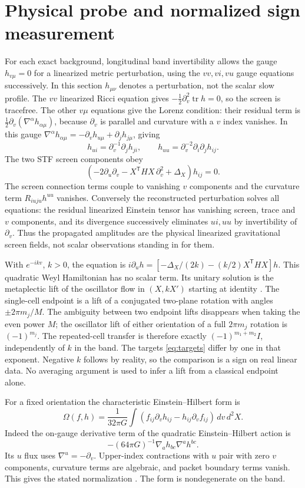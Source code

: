 \documentclass[11pt]{article}
\newcommand{\tr}{\operatorname{tr}}
\begin{document}
\section{Physical probe and normalized sign measurement}
For each exact background, longitudinal band invertibility allows the gauge \(h_{v\mu}=0\) for a linearized metric perturbation, using the \(vv,vi,vu\) gauge equations successively. In this section \(h_{\mu\nu}\) denotes a perturbation, not the scalar slow profile. The \(vv\) linearized Ricci equation gives \(-\tfrac12\partial_v^2\tr h=0\), so the screen is tracefree. The other \(v\mu\) equations give the Lorenz condition: their residual term is \(\tfrac12\partial_v(\nabla^\alpha h_{\alpha\mu})\), because \(\partial_v\) is parallel and curvature with a \(v\) index vanishes. In this gauge \(\nabla^\alpha h_{\alpha\mu}=-\partial_v h_{u\mu}+\partial_jh_{j\mu}\), giving
\[
 h_{ui}=\partial_v^{-1}\partial_jh_{ji},\qquad
 h_{uu}=\partial_v^{-2}\partial_i\partial_jh_{ij}.
\]
The two STF screen components obey
\[
 (-2\partial_u\partial_v-X^\mathsf T H X\,\partial_v^2+\Delta_X)h_{ij}=0 .
\]
The screen connection terms couple to vanishing \(v\) components and the curvature term \(R_{iuju}h^{uu}\) vanishes. Conversely the reconstructed perturbation solves all equations: the residual linearized Einstein tensor has vanishing screen, trace and \(v\) components, and its divergence successively eliminates \(ui,uu\) by invertibility of \(\partial_v\). Thus the propagated amplitudes are the physical linearized gravitational screen fields, not scalar observations standing in for them.

With \(e^{-ikv}\), \(k>0\), the equation is \(i\partial_u h=[-\Delta_X/(2k)-(k/2)X^\mathsf T H X]h\). This quadratic Weyl Hamiltonian has no scalar term. Its unitary solution is the metaplectic lift of the oscillator flow in \((X,kX')\) starting at identity \cite{littlejohn}. The single-cell endpoint is a lift of a conjugated two-plane rotation with angles \(\pm2\pi m_j/M\). The ambiguity between two endpoint lifts disappears when taking the even power \(M\); the oscillator lift of either orientation of a full \(2\pi m_j\) rotation is \((-1)^{m_j}\). The repeated-cell transfer is therefore exactly \((-1)^{m_1+m_2}I\), independently of \(k\) in the band. The targets \eqref{eq:targets} differ by one in that exponent. Negative \(k\) follows by reality, so the comparison is a sign on real linear data. No averaging argument is used to infer a lift from a classical endpoint alone.

For a fixed orientation the characteristic Einstein--Hilbert form is
\[
 \Omega(f,h)=\frac{1}{32\pi G}\int
       (f_{ij}\partial_vh_{ij}-h_{ij}\partial_v f_{ij})\,dv\,d^2X .
\]
Indeed the on-gauge derivative term of the quadratic Einstein--Hilbert action is
\[
 -(64\pi G)^{-1}\nabla_a h_{bc}\nabla^a h^{bc}.
\]
Its \(u\) flux uses \(\nabla^u=-\partial_v\). Upper-index contractions with \(u\) pair with zero \(v\) components, curvature terms are algebraic, and packet boundary terms vanish. This gives the stated normalization \cite{p31}. The form is nondegenerate on the band.
\end{document}
